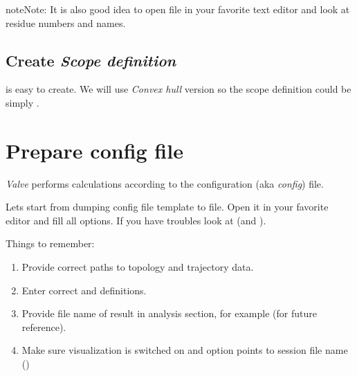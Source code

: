 \documentclass[a4paper,10pt,english]{sphinxmanual}
\begin{document}
\begin{notice}{note}{Note:}
It is also good idea to open  file in your favorite text editor and look at residue numbers and names.
\end{notice}


\subsection{Create \emph{Scope definition}}
\label{valve/valve_tutorial:create-scope-definition}
{\hyperref[valve/valve_manual:scope\string-definition]{}} is easy to create. We will use \emph{Convex hull} version so the scope definition could be simply .


\section{Prepare config file}
\label{valve/valve_tutorial:prepare-config-file}
\emph{Valve} performs calculations according to the configuration (aka \emph{config}) file.

Lets start from dumping config file template to  file. Open it in your favorite editor and fill all options.
If you have troubles look at {\hyperref[valve/valve_config::doc]{}} (and {\hyperref[valve/valve_manual::doc]{}}).

Things to remember:
\begin{enumerate}
\item {} 
Provide correct paths to topology and trajectory data.

\item {} 
Enter correct {\hyperref[valve/valve_manual:object\string-definition]{}} and {\hyperref[valve/valve_manual:scope\string-definition]{}} definitions.

\item {} 
Provide file name of result in analysis section, for example  (for future reference).

\item {} 
Make sure visualization is switched on and  option points to session file name ()

\end{enumerate}
\end{document}
